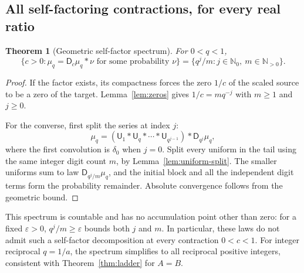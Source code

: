 \documentclass[11pt,a4paper]{article}
\newtheorem{theorem}{Theorem}[section]
\theoremstyle{definition}
\theoremstyle{remark}
\newcommand{\N}{\mathbb N}
\newcommand{\D}{\mathsf D}
\newcommand{\Unif}{\mathsf U}
\begin{document}
\subsection{All self-factoring contractions, for every real ratio}
\begin{theorem}[Geometric self-factor spectrum]\label{thm:self-spectrum}
For $0<q<1$,
\begin{equation}\label{eq:self-spectrum}
 \{c>0:\mu_q=\D_c\mu_q*\nu\text{ for some probability }\nu\}
 =\{q^j/m:j\in\N_0,\ m\in\N_{>0}\}.
\end{equation}
\end{theorem}
\begin{proof}
If the factor exists, its compactness forces the zero $1/c$ of the scaled
source to be a zero of the target. Lemma~\ref{lem:zeros} gives
$1/c=mq^{-j}$ with $m\ge1$ and $j\ge0$.

For the converse, first split the series at index $j$:
\[
 \mu_q=(\Unif_1*\Unif_q*\cdots*\Unif_{q^{j-1}})*\D_{q^j}\mu_q,
\]
where the first convolution is $\delta_0$ when $j=0$. Split every uniform
in the tail using the same integer digit count $m$, by
Lemma~\ref{lem:uniform-split}. The smaller uniforms sum to law
$\D_{q^j/m}\mu_q$, and the initial block and all the independent digit
terms form the probability remainder. Absolute convergence follows from
the geometric bound.
\end{proof}

This spectrum is countable and has no accumulation point other than zero:
for a fixed $\varepsilon>0$, $q^j/m\ge\varepsilon$ bounds both $j$ and $m$.
In particular, these laws do not admit such a self-factor decomposition at
every contraction $0<c<1$. For integer reciprocal $q=1/a$, the spectrum
simplifies to all reciprocal positive integers, consistent with
Theorem~\ref{thm:ladder} for $A=B$.
\end{document}
